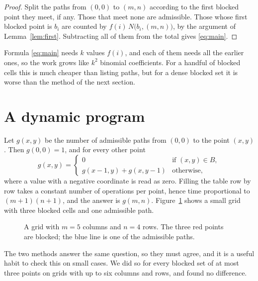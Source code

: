 \documentclass[11pt]{article}
\theoremstyle{definition}
\begin{document}
\begin{proof}
Split the paths from $(0,0)$ to $(m,n)$ according to the first blocked point they meet, if any. Those that meet none are admissible. Those whose first blocked point is $b_i$ are counted by $f(i)\,N\big(b_i,(m,n)\big)$, by the argument of Lemma~\ref{lem:first}. Subtracting all of them from the total gives \eqref{eq:main}.
\end{proof}

Formula \eqref{eq:main} needs $k$ values $f(i)$, and each of them needs all the earlier ones, so the work grows like $k^2$ binomial coefficients. For a handful of blocked cells this is much cheaper than listing paths, but for a dense blocked set it is worse than the method of the next section.

\section{A dynamic program}
\label{sec:dp}

Let $g(x,y)$ be the number of admissible paths from $(0,0)$ to the point $(x,y)$. Then $g(0,0)=1$, and for every other point
\[
  g(x,y) =
  \begin{cases}
    0 & \text{if } (x,y)\in B,\\
    g(x-1,y) + g(x,y-1) & \text{otherwise,}
  \end{cases}
\]
where a value with a negative coordinate is read as zero. Filling the table row by row takes a constant number of operations per point, hence time proportional to $(m+1)(n+1)$, and the answer is $g(m,n)$. Figure~\ref{fig:grid} shows a small grid with three blocked cells and one admissible path.

\begin{figure}[ht]
\centering
{}
\caption{A grid with $m=5$ columns and $n=4$ rows. The three red points are blocked; the blue line is one of the admissible paths.}
\label{fig:grid}
\end{figure}

The two methods answer the same question, so they must agree, and it is a useful habit to check this on small cases. We did so for every blocked set of at most three points on grids with up to six columns and rows, and found no difference.
\end{document}
